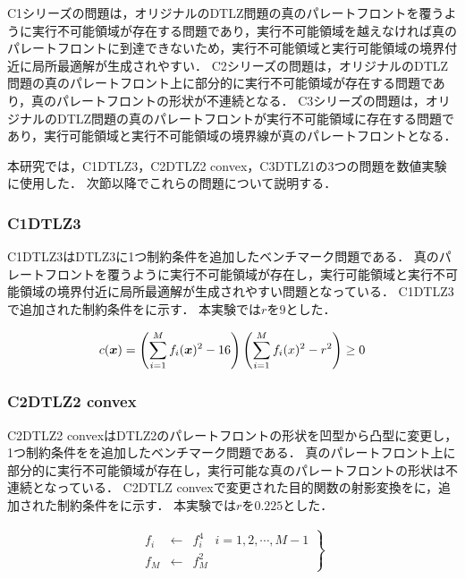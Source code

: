 \documentclass[../main/main]{subfiles}
\begin{document}
C1シリーズの問題は，オリジナルのDTLZ問題の真のパレートフロントを覆うように実行不可能領域が存在する問題であり，実行不可能領域を越えなければ真のパレートフロントに到達できないため，実行不可能領域と実行可能領域の境界付近に局所最適解が生成されやすい．
C2シリーズの問題は，オリジナルのDTLZ問題の真のパレートフロント上に部分的に実行不可能領域が存在する問題であり，真のパレートフロントの形状が不連続となる．
C3シリーズの問題は，オリジナルのDTLZ問題の真のパレートフロントが実行不可能領域に存在する問題であり，実行可能領域と実行不可能領域の境界線が真のパレートフロントとなる．

本研究では，C1DTLZ3，C2DTLZ2 convex，C3DTLZ1の3つの問題を数値実験に使用した．
次節以降でこれらの問題について説明する．

\subsubsection{C1DTLZ3}
C1DTLZ3はDTLZ3に1つ制約条件を追加したベンチマーク問題である．
真のパレートフロントを覆うように実行不可能領域が存在し，実行可能領域と実行不可能領域の境界付近に局所最適解が生成されやすい問題となっている．
C1DTLZ3で追加された制約条件をに示す．
本実験では$r$を$9$とした．

\begin{equation}
\centering
c(\bm{x}) = \left( \sum^M_{i=1} f_i (\bm{x})^2 - 16 \right) \left( \sum^M_{i=1} f_i(x)^2 - r^2 \right) \geq 0
\label{c1dtlz3_const}
\end{equation}


\subsubsection{C2DTLZ2 convex}
C2DTLZ2 convexはDTLZ2のパレートフロントの形状を凹型から凸型に変更し，1つ制約条件をを追加したベンチマーク問題である．
真のパレートフロント上に部分的に実行不可能領域が存在し，実行可能な真のパレートフロントの形状は不連続となっている．
C2DTLZ convexで変更された目的関数の射影変換をに，追加された制約条件をに示す．
本実験では$r$を$0.225$とした．

\begin{eqnarray}
\left.
\begin{array}{rcl}
f_i &\longleftarrow& f^4_i \ \ \ \ i = 1, 2, \cdots, M-1\\
f_M &\longleftarrow& f^2_M
\end{array}
\right\}
\label{c2dtlz2_changed}
\end{eqnarray}
\end{document}
